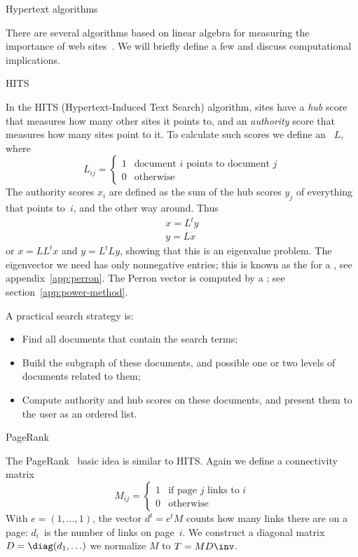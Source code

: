  {Hypertext algorithms}
\label{sec:pagerank}

There are several algorithms based on linear algebra
for measuring the importance of web
sites~\cite{Langville2005eigenvector}. We will briefly define a few
and discuss computational implications.

 {HITS}

In the HITS (Hypertext-Induced
Text Search) algorithm, sites have a \emph{hub} score that measures how many
other sites it points to, and an \emph{authority} score that measures
how many sites point to it. To calculate such scores we define an
~$L$, where
\[ L_{ij}=
\begin{cases}
  1&\mbox{document $i$ points to document $j$}\\
  0&\mbox{otherwise}
\end{cases}
\]
The authority scores $x_i$ are defined as the sum of the hub scores
$y_j$ of everything that points to~$i$, and the other way around. Thus
\[
\begin{array}{l}
  x=L^ty\\ y=Lx
\end{array}
\]
or $x=LL^tx$ and $y=L^tLy$, showing that this is an eigenvalue
problem. The eigenvector we need has only nonnegative entries; this is
known as the  for a
, see appendix~\ref{app:perron}. The
Perron vector is computed by a ; see
section~\ref{app:power-method}.

A practical search strategy is:
\begin{itemize}
\item Find all documents that contain the search terms;
\item Build the subgraph of these documents, and possible one or two
  levels of documents related to them;
\item Compute authority and hub scores on these documents, and present
  them to the user as an ordered list.
\end{itemize}


 {PageRank}

The PageRank~\cite{PageBrin:PageRank} basic idea is similar to
HITS. Again we define a connectivity matrix
\[ M_{ij}=
\begin{cases}
  1&\mbox{if page $j$ links to $i$}\\
  0&\mbox{otherwise}
\end{cases}
\]
With $e=(1,\ldots,1)$, the vector $d^t=e^tM$ counts how many links
there are on a page: $d_i$~is the number of links on page~$i$. We
construct a diagonal matrix $D=\diag(d_1,\ldots)$ we normalize $M$ to
$T=MD\inv$. 

